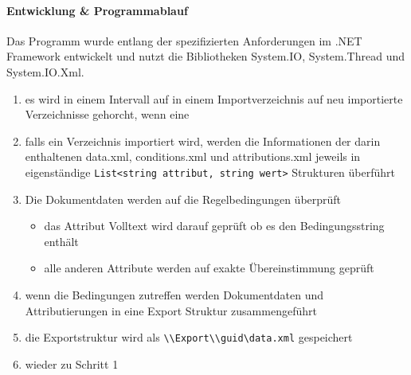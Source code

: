 \documentclass[11pt,oneside,a4paper,notitlepage]{article}
\begin{document}
\paragraph*{Entwicklung \& Programmablauf}
Das Programm wurde entlang der spezifizierten Anforderungen im .NET Framework entwickelt und nutzt die Bibliotheken System.IO, System.Thread und System.IO.Xml. 

\begin{enumerate}
\item es wird in einem Intervall auf in einem Importverzeichnis auf neu importierte Verzeichnisse gehorcht, wenn eine
\item falls ein Verzeichnis importiert wird, werden die Informationen der darin enthaltenen data.xml, conditions.xml und attributions.xml jeweils in eigenständige \verb+List<string attribut, string wert>+ Strukturen überführt
\item Die Dokumentdaten werden auf die Regelbedingungen überprüft
\begin{itemize}
\item das Attribut Volltext wird darauf geprüft ob es den Bedingungsstring enthält
\item alle anderen Attribute werden auf exakte Übereinstimmung geprüft
\end{itemize}
\item wenn die Bedingungen zutreffen werden Dokumentdaten und Attributierungen in eine Export Struktur zusammengeführt
\item die Exportstruktur wird als \verb+\\Export\\guid\data.xml+ gespeichert
\item wieder zu Schritt 1
\end{enumerate}
\end{document}
